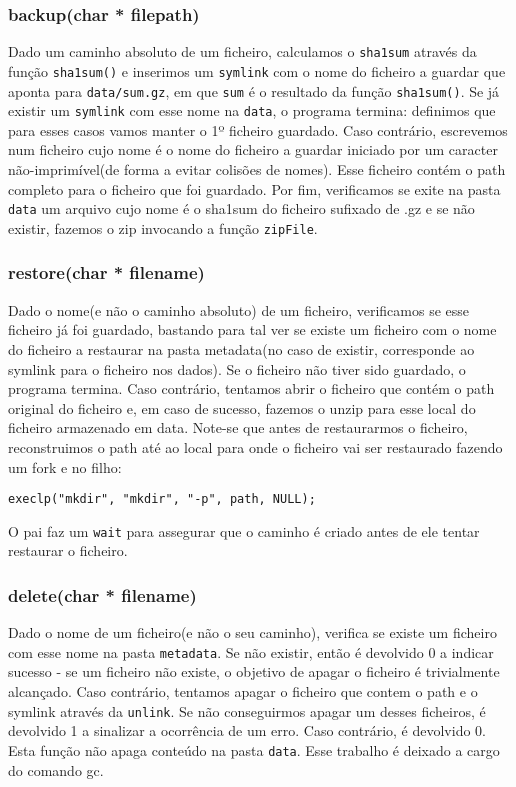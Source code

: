 \documentclass[a4paper,12pt,titlepage,draft,portuguese]{article}
\begin{document}
\subsubsection{backup(char * filepath)}
Dado um caminho absoluto de um ficheiro, calculamos o \texttt{sha1sum} através da função \texttt{sha1sum()} e inserimos um \texttt{symlink} com o nome do ficheiro a guardar que aponta
para \texttt{data/sum.gz}, em que \texttt{sum} é o resultado da função \texttt{sha1sum()}. Se já existir um \texttt{symlink} com esse nome na \texttt{data},
o programa termina: definimos que para esses casos vamos manter o 1º ficheiro guardado. Caso contrário, escrevemos num ficheiro cujo nome é o nome do ficheiro a 
guardar iniciado por um caracter não-imprimível(de forma a evitar colisões de nomes). Esse ficheiro contém o path completo para o ficheiro que foi guardado.
Por fim, verificamos se exite na pasta \texttt{data} um arquivo cujo nome é o sha1sum do ficheiro sufixado de .gz e se não existir, fazemos o zip invocando a função \texttt{zipFile}.

\subsubsection{restore(char * filename)}
Dado o nome(e não o caminho absoluto) de um ficheiro, verificamos se esse ficheiro já foi guardado, bastando para tal ver se existe um ficheiro com
o nome do ficheiro a restaurar na pasta metadata(no caso de existir, corresponde ao symlink para o ficheiro nos dados). Se o ficheiro não tiver sido guardado, o programa termina.
Caso contrário, tentamos abrir o ficheiro que contém o path original do ficheiro e, em caso de sucesso, fazemos o unzip para esse local do ficheiro 
armazenado em data. Note-se que antes de restaurarmos o ficheiro, reconstruimos o path até ao local para onde o ficheiro vai ser restaurado
fazendo um fork e no filho:
\begin{verbatim}
execlp("mkdir", "mkdir", "-p", path, NULL);
\end{verbatim}

O pai faz um \texttt{wait} para assegurar que o caminho é criado antes de ele tentar restaurar o ficheiro.

\subsubsection{delete(char * filename)}
Dado o nome de um ficheiro(e não o seu caminho), verifica se existe um ficheiro com esse nome na pasta \texttt{metadata}. Se não existir, então é
devolvido 0 a indicar sucesso - se um ficheiro não existe, o objetivo de apagar o ficheiro é trivialmente alcançado.
Caso contrário, tentamos apagar o ficheiro que contem o path e o symlink através da \texttt{unlink}. Se não
conseguirmos apagar um desses ficheiros, é devolvido 1 a sinalizar a ocorrência de um erro. Caso contrário, é devolvido 0.
Esta função não apaga conteúdo na pasta \texttt{data}. Esse trabalho é deixado a cargo do comando gc.
\end{document}
